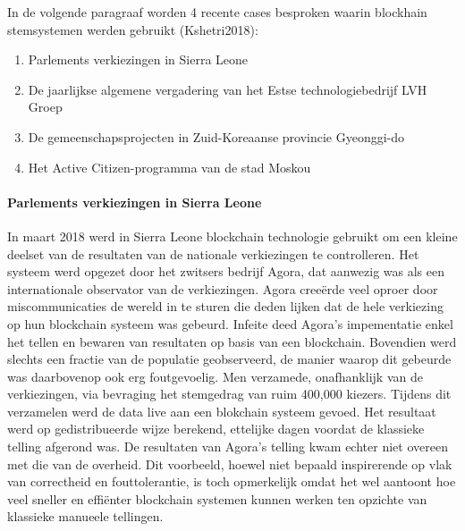 			In de volgende paragraaf worden 4 recente cases besproken waarin blockhain stemsystemen werden gebruikt (Kshetri2018):
			\begin{enumerate}
				\item Parlements verkiezingen in Sierra Leone
				\item De jaarlijkse algemene vergadering van het Estse technologiebedrijf LVH Groep
				\item De gemeenschapsprojecten in Zuid-Koreaanse provincie Gyeonggi-do
				\item Het Active Citizen-programma van de stad Moskou
			\end{enumerate}
				
				\paragraph{Parlements verkiezingen in Sierra Leone}
				In maart 2018 werd in Sierra Leone blockchain technologie gebruikt om een kleine deelset van de resultaten van de nationale verkiezingen te controlleren. Het systeem werd opgezet door het zwitsers bedrijf Agora, dat aanwezig was als een internationale observator van de verkiezingen. Agora creeërde veel oproer door miscommunicaties de wereld in te sturen die  deden lijken dat de hele verkiezing op hun blockchain systeem was gebeurd. Infeite deed Agora's impementatie enkel het tellen en bewaren van resultaten op basis van een blockchain. Bovendien werd slechts een fractie van de populatie geobserveerd, de manier waarop dit gebeurde was daarbovenop ook erg foutgevoelig. Men verzamede, onafhanklijk van de verkiezingen, via bevraging het stemgedrag van ruim 400,000 kiezers. Tijdens dit verzamelen werd de data live aan een blokchain systeem gevoed. Het resultaat werd op gedistribueerde wijze berekend, ettelijke dagen voordat de klassieke telling afgerond was. De resultaten van Agora's telling kwam echter niet overeen met die van de overheid. Dit voorbeeld, hoewel niet bepaald  inspirerende op vlak van correctheid en fouttolerantie, is toch opmerkelijk omdat het wel aantoont hoe veel sneller en effiënter blockchain systemen kunnen werken ten opzichte van klassieke manueele tellingen.
				
